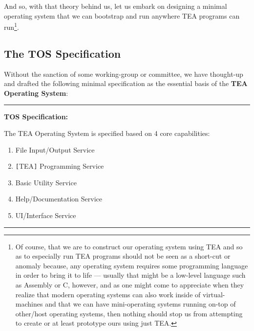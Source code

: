 \documentclass[a4paper, 18pt]{book} %
\begin{document}
{{{\vspace{2em}

And so, with that theory behind us, let us embark on designing a minimal operating system that we can bootstrap and run anywhere TEA programs can run\footnote{Of course, that we are to construct our operating system using TEA and so as to especially run TEA programs should not be seen as a short-cut or anomaly because, any operating system requires some programming language in order to bring it to life --- usually that might be a low-level language such as Assembly or C\cite{kain1999advanced}\cite{arpacidusseau2018ostep}, however, and as one might come to appreciate when they realize that modern operating systems can also work inside of virtual-machines and that we can have mini-operating systems running on-top of other/host operating systems, then nothing should stop us from attempting to create or at least prototype ours using just TEA.}.


\subsection{The TOS Specification}
\label{SECTOSSPEC}

Without the sanction of some working-group or committee, we have thought-up and drafted the following minimal specification as the essential basis of the \textbf{TEA Operating System}:

\vspace{2em}

\noindent\rule{\textwidth}{0.4pt}

{
\LARGE

\textbf{TOS Specification:}

The TEA Operating System is specified based on 4 core capabilities:

\begin{enumerate}
\item File Input/Output Service
\item \verb$[$TEA\verb$]$ Programming Service
\item Basic Utility Service
\item Help/Documentation Service
\item UI/Interface Service
\end{enumerate}

}

\noindent\rule{\textwidth}{0.4pt}

\vspace{2em}


}}}
\end{document}
